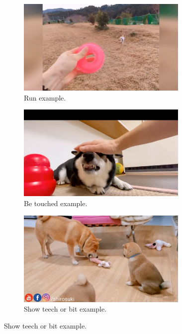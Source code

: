 \documentclass[letterpaper]{article}
\begin{document}
\begin{figure}[h]
\begin{subfigure}[]{0.3\textwidth}
	\centering
	\includegraphics[width=0.9\textwidth]{images/run.jpg}
	\caption{Run example.}
	\label{fig:act10}
\end{subfigure}
\begin{subfigure}[]{0.3\textwidth}
	\centering
	\includegraphics[width=0.9\textwidth]{images/betouched.jpg}
	\caption{Be touched example.}
\label{fig:act11}
\end{subfigure}
\begin{subfigure}[]{0.3\textwidth}
	\centering
	\includegraphics[width=0.9\textwidth]{images/showteethorbit.jpg}
	\caption{Show teech or bit example.}
\label{fig:act12}
\end{subfigure}


\end{figure}
\end{document}
